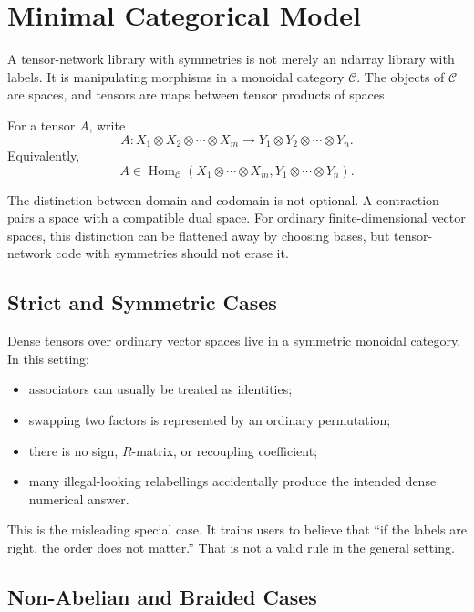 \documentclass[11pt]{article}
\newcommand{\catC}{\mathcal{C}}
\newcommand{\Hom}{\operatorname{Hom}}
\begin{document}
\section{Minimal Categorical Model}

A tensor-network library with symmetries is not merely an ndarray
library with labels.  It is manipulating morphisms in a monoidal
category \(\catC\).  The objects of \(\catC\) are spaces, and tensors
are maps between tensor products of spaces.

For a tensor \(A\), write
\[
  A : X_1 \otimes X_2 \otimes \cdots \otimes X_m
      \longrightarrow
      Y_1 \otimes Y_2 \otimes \cdots \otimes Y_n .
\]
Equivalently,
\[
  A \in \Hom_{\catC}
       (X_1 \otimes \cdots \otimes X_m,
        Y_1 \otimes \cdots \otimes Y_n).
\]

The distinction between domain and codomain is not optional.  A
contraction pairs a space with a compatible dual space.  For ordinary
finite-dimensional vector spaces, this distinction can be flattened
away by choosing bases, but tensor-network code with symmetries should
not erase it.

\subsection{Strict and Symmetric Cases}

Dense tensors over ordinary vector spaces live in a symmetric monoidal
category.  In this setting:

\begin{itemize}[nosep]
  \item associators can usually be treated as identities;
  \item swapping two factors is represented by an ordinary permutation;
  \item there is no sign, \(R\)-matrix, or recoupling coefficient;
  \item many illegal-looking relabellings accidentally produce the
        intended dense numerical answer.
\end{itemize}

This is the misleading special case.  It trains users to believe that
``if the labels are right, the order does not matter.''  That is not a
valid rule in the general setting.

\subsection{Non-Abelian and Braided Cases}
\end{document}

